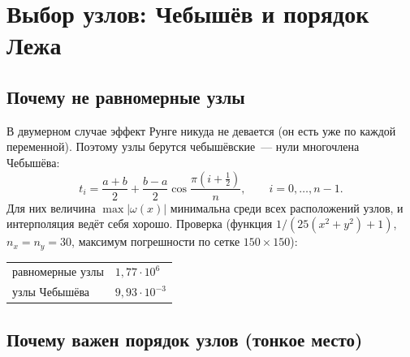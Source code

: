 \documentclass[11pt,a4paper]{report}
\begin{document}
\section{Выбор узлов: Чебышёв и порядок Лежа}

\subsection{Почему не равномерные узлы}

В двумерном случае эффект Рунге никуда не девается (он есть уже по каждой
переменной). Поэтому узлы берутся чебышёвские~--- нули многочлена Чебышёва:
\[
t_i=\frac{a+b}{2}+\frac{b-a}{2}\cos\frac{\pi(i+\tfrac12)}{n},\qquad i=0,\dots,n-1 .
\]
Для них величина $\max|\omega(x)|$ минимальна среди всех расположений узлов, и
интерполяция ведёт себя хорошо. Проверка (функция
$1/(25(x^2+y^2)+1)$, $n_x=n_y=30$, максимум погрешности по сетке $150\times150$):
\begin{center}
\begin{tabular}{ll}
\toprule
равномерные узлы & $1{,}77\cdot10^{6}$ \\
узлы Чебышёва & $9{,}93\cdot10^{-3}$ \\
\bottomrule
\end{tabular}
\end{center}

\subsection{Почему важен порядок узлов (тонкое место)}
\end{document}
